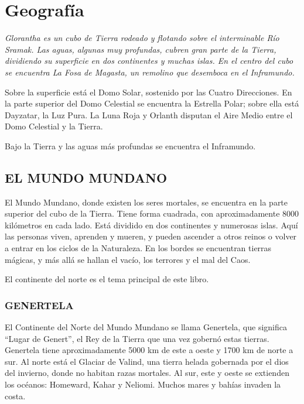 \chapter{Geografía} %
\label{cha:geografia} %

\textit{Glorantha es un cubo de Tierra rodeado y flotando sobre el interminable Río Sramak. Las aguas, algunas muy profundas, cubren gran parte de la Tierra, dividiendo su superficie en dos continentes y muchas islas. En el centro del cubo se encuentra La Fosa de Magasta, un remolino que desemboca en el Inframundo.}

Sobre la superficie está el Domo Solar, sostenido por las Cuatro Direcciones. En la parte superior del Domo Celestial se encuentra la Estrella Polar; sobre ella está Dayzatar, la Luz Pura. La Luna Roja y Orlanth disputan el Aire Medio entre el Domo Celestial y la Tierra.

Bajo la Tierra y las aguas más profundas se encuentra el Inframundo.

\section{EL MUNDO MUNDANO}
\label{sec:el_mundo_mundano}
El Mundo Mundano, donde existen los seres mortales, se encuentra en la parte superior del cubo de la Tierra. Tiene forma cuadrada, con aproximadamente 8000 kilómetros en cada lado. Está dividido en dos continentes y numerosas islas. Aquí las personas viven, aprenden y mueren, y pueden ascender a otros reinos o volver a entrar en los ciclos de la Naturaleza. En los bordes se encuentran tierras mágicas, y más allá se hallan el vacío, los terrores y el mal del Caos.

El continente del norte es el tema principal de este libro.

\subsection{GENERTELA}
El Continente del Norte del Mundo Mundano se llama Genertela, que significa “Lugar de Genert”, el Rey de la Tierra que una vez gobernó estas tierras. Genertela tiene aproximadamente 5000 km de este a oeste y 1700 km de norte a sur. Al norte está el Glaciar de Valind, una tierra helada gobernada por el dios del invierno, donde no habitan razas mortales. Al sur, este y oeste se extienden los océanos: Homeward, Kahar y Neliomi. Muchos mares y bahías invaden la costa.

